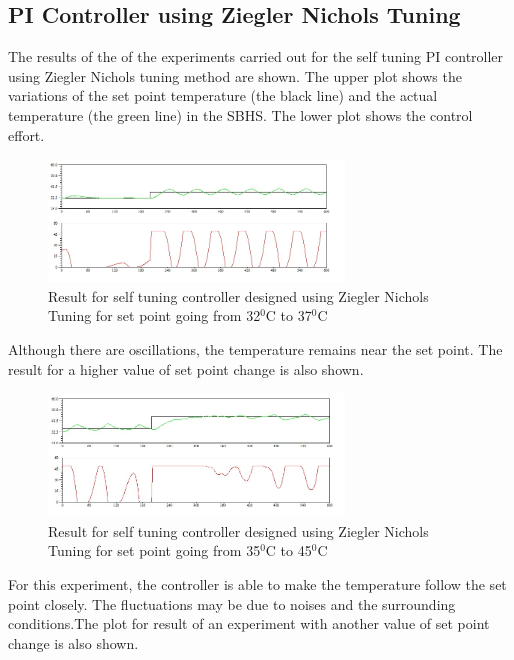 \subsection{PI Controller using Ziegler Nichols Tuning}
The results of the of the experiments carried out for the self tuning PI controller using Ziegler Nichols tuning method are 
shown. The upper plot shows the variations of the set point temperature (the black line) and the actual temperature 
(the green line) in the SBHS. The lower plot shows the control effort.
\begin{figure}[h]
	
		\centering
\includegraphics[width=0.7\textwidth]{Vikas_self/report_tex/PID_results/self_tuning/NewSetpoint_change/PI/step32to37.jpg}
		\caption{Result for self tuning controller designed using Ziegler Nichols Tuning for set point going from 32$^0$C to 37$^0$C}
\end{figure}

Although there are oscillations, the temperature remains near the set point. The result for a higher value of set point 
change is also shown.
\begin{figure}[h]
	\centering
\includegraphics[width=0.7\textwidth]{Vikas_self/report_tex/PID_results/self_tuning/NewSetpoint_change/PI/step35to45.jpg}
		\caption{Result for self tuning controller designed using Ziegler Nichols Tuning for set point going from 35$^0$C to 45$^0$C}

	
\end{figure}

For this experiment, the controller is able to make the temperature follow the set point closely. The fluctuations 
may be due to noises and the surrounding conditions.The plot for result of an experiment with another value of set
point change is also shown.

